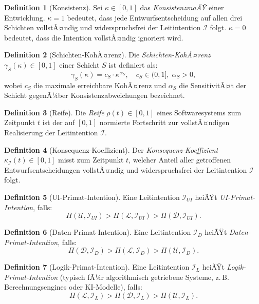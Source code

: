 ﻿\documentclass[a4paper,12pt]{article}
\theoremstyle{definition}
\newtheorem{definition}{Definition}
\begin{document}
\begin{definition}[Konsistenz]
Sei $\kappa \in [0,1]$ das \emph{KonsistenzmaÃŸ} einer Entwicklung.
$\kappa = 1$ bedeutet, dass jede Entwurfsentscheidung auf allen drei
Schichten vollstÃ¤ndig und widerspruchsfrei der Leitintention $\mathcal{I}$
folgt. $\kappa = 0$ bedeutet, dass die Intention vollstÃ¤ndig ignoriert wird.
\end{definition}

\begin{definition}[Schichten-KohÃ¤renz]
Die \emph{Schichten-KohÃ¤renz} $\gamma_S(\kappa) \in [0,1]$ einer Schicht
$S$ ist definiert als:
\[
\gamma_S(\kappa) = c_S \cdot \kappa^{\alpha_S},
\quad c_S \in (0,1], \; \alpha_S > 0,
\]
wobei $c_S$ die maximale erreichbare KohÃ¤renz und $\alpha_S$ die
SensitivitÃ¤t der Schicht gegenÃ¼ber Konsistenzabweichungen bezeichnet.
\end{definition}

\begin{definition}[Reife]
Die \emph{Reife} $\rho(t) \in [0,1]$ eines Softwaresystems zum Zeitpunkt $t$
ist der auf $[0,1]$ normierte Fortschritt zur vollstÃ¤ndigen Realisierung
der Leitintention $\mathcal{I}$.
\end{definition}

\begin{definition}[Konsequenz-Koeffizient]
Der \emph{Konsequenz-Koeffizient} $\kappa_{\mathcal{I}}(t) \in [0,1]$
misst zum Zeitpunkt $t$, welcher Anteil aller getroffenen
Entwurfsentscheidungen vollstÃ¤ndig und widerspruchsfrei der
Leitintention $\mathcal{I}$ folgt.
\end{definition}

\begin{definition}[UI-Primat-Intention]
Eine Leitintention $\mathcal{I}_{UI}$ heiÃŸt \emph{UI-Primat-Intention}, falls:
\[
\Pi(\mathcal{U}, \mathcal{I}_{UI}) > \Pi(\mathcal{L}, \mathcal{I}_{UI})
> \Pi(\mathcal{D}, \mathcal{I}_{UI}).
\]
\end{definition}

\begin{definition}[Daten-Primat-Intention]
Eine Leitintention $\mathcal{I}_{D}$ heiÃŸt \emph{Daten-Primat-Intention}, falls:
\[
\Pi(\mathcal{D}, \mathcal{I}_{D}) > \Pi(\mathcal{L}, \mathcal{I}_{D})
> \Pi(\mathcal{U}, \mathcal{I}_{D}).
\]
\end{definition}

\begin{definition}[Logik-Primat-Intention]
Eine Leitintention $\mathcal{I}_{L}$ heiÃŸt \emph{Logik-Primat-Intention}
(typisch fÃ¼r algorithmisch getriebene Systeme, z.\,B. Berechnungsengines
oder KI-Modelle), falls:
\[
\Pi(\mathcal{L}, \mathcal{I}_{L}) > \Pi(\mathcal{D}, \mathcal{I}_{L})
> \Pi(\mathcal{U}, \mathcal{I}_{L}).
\]
\end{definition}
\end{document}
